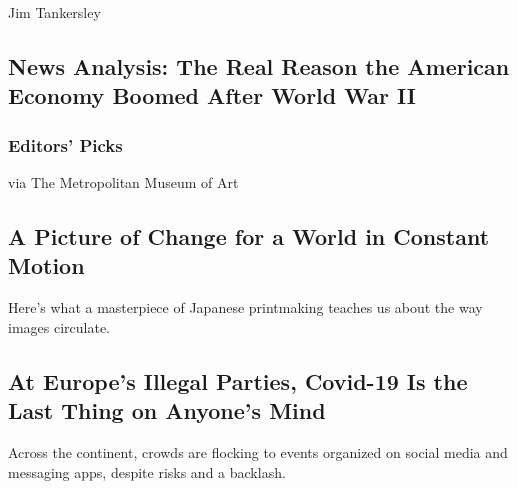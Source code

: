 \href{/2020/08/06/sunday-review/middle-class-prosperity.html}{}

Jim Tankersley

\hypertarget{news-analysis-the-real-reason-the-american-economy-boomed-after-world-war-ii}{%
\subsection{News Analysis: The Real Reason the American Economy Boomed
After World War
II}\label{news-analysis-the-real-reason-the-american-economy-boomed-after-world-war-ii}}

\hypertarget{editors-picks}{%
\subsubsection{Editors' Picks}\label{editors-picks}}

\href{/interactive/2020/08/07/arts/design/hokusai-fuji.html}{}

via The Metropolitan Museum of Art

\href{/interactive/2020/08/07/arts/design/hokusai-fuji.html}{}

\hypertarget{a-picture-of-change-for-a-world-in-constant-motion}{%
\subsection{A Picture of Change for a World in Constant
Motion}\label{a-picture-of-change-for-a-world-in-constant-motion}}

Here's what a masterpiece of Japanese printmaking teaches us about the
way images circulate.

\href{/2020/08/07/arts/music/illegal-parties-coronavirus-europe.html}{}

\hypertarget{at-europes-illegal-parties-covid-19-is-the-last-thing-on-anyones-mind}{%
\subsection{At Europe's Illegal Parties, Covid-19 Is the Last Thing on
Anyone's
Mind}\label{at-europes-illegal-parties-covid-19-is-the-last-thing-on-anyones-mind}}

Across the continent, crowds are flocking to events organized on social
media and messaging apps, despite risks and a backlash.

\href{/2020/08/07/arts/music/illegal-parties-coronavirus-europe.html}{}

\href{/2020/08/07/business/how-to-handle-a-friendly-co-worker-whos-really-a-total-jerk.html}{}

